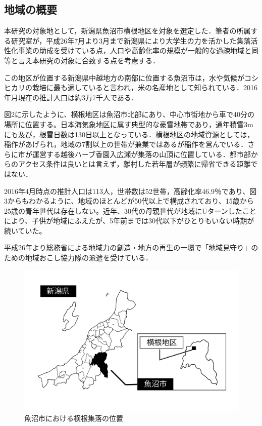 \documentclass[a4paper]{jsarticle}
\begin{document}
\subsection{地域の概要}
本研究の対象地として，新潟県魚沼市横根地区を対象を選定した．筆者の所属する研究室が，平成26年7月より3月まで新潟県により大学生の力を活かした集落活性化事業の助成を受けている点，人口や高齢化率の規模が一般的な過疎地域と同等と言え本研究の対象に合致する点を考慮する．\par
この地区が位置する新潟県中越地方の南部に位置する魚沼市は，水や気候がコシヒカリの栽培に最も適していると言われ，米の名産地として知られている．2016年月現在の推計人口は約3万7千人である．\par
図2に示したように、横根地区は魚沼市北部にあり、中心市街地から車で40分の場所に位置する。日本海気象地区に属す典型的な豪雪地帯であり，通年積雪3mにも及び，根雪日数は130日以上となっている．横根地区の地域資源としては，稲作があげられ，地域の7割以上の世帯が兼業ではあるが稲作を営んでいる．さらに市が運営する越後ハーブ香園入広瀬が集落の山頂に位置している．都市部からのアクセス条件は良いとは言えず，離村した若年層が頻繁に帰省できる距離ではない．\par
2016年4月時点の推計人口は113人，世帯数は52世帯，高齢化率46.9％であり、図3からもわかるように、地域のほとんどが50代以上で構成されており、15歳から25歳の青年世代は存在しない。近年、30代の母親世代が地域にUターンしたことにより、子供が地域にふえたが、5年前までは30代以下がひとりもいない時期が続いていた。\par
平成26年より総務省による地域力の創造・地方の再生の一環で「地域見守り」のための地域おこし協力隊の派遣を受けている．
\begin{figure}[H]
  \begin{center}
    \includegraphics[width=1.0\hsize]{./images/yokone_place.pdf}
    \caption{魚沼市における横根集落の位置}
    \label{fig:tmu_hino}
  \end{center}
\end{figure}
\end{document}
